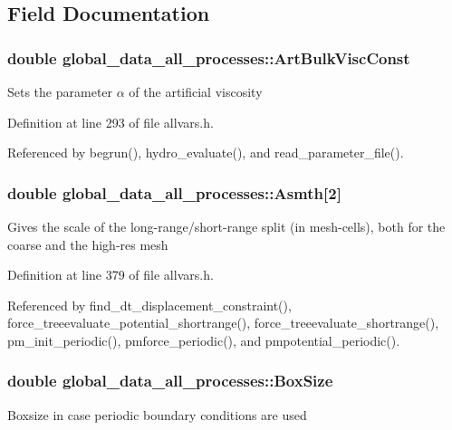 \subsection{Field Documentation}
\hypertarget{structglobal__data__all__processes_a14b9df6a6579d2ce6ef7c86aa0230217}{
\subsubsection[{ArtBulkViscConst}]{\setlength{\rightskip}{0pt plus 5cm}double {\bf global\_\-data\_\-all\_\-processes::ArtBulkViscConst}}}
\label{structglobal__data__all__processes_a14b9df6a6579d2ce6ef7c86aa0230217}
Sets the parameter $\alpha$ of the artificial viscosity 

Definition at line 293 of file allvars.h.



Referenced by begrun(), hydro\_\-evaluate(), and read\_\-parameter\_\-file().

\hypertarget{structglobal__data__all__processes_a3bf3f2dd9be45f8f203424e57b9d9de3}{
\subsubsection[{Asmth}]{\setlength{\rightskip}{0pt plus 5cm}double {\bf global\_\-data\_\-all\_\-processes::Asmth}\mbox{[}2\mbox{]}}}
\label{structglobal__data__all__processes_a3bf3f2dd9be45f8f203424e57b9d9de3}
Gives the scale of the long-\/range/short-\/range split (in mesh-\/cells), both for the coarse and the high-\/res mesh 

Definition at line 379 of file allvars.h.



Referenced by find\_\-dt\_\-displacement\_\-constraint(), force\_\-treeevaluate\_\-potential\_\-shortrange(), force\_\-treeevaluate\_\-shortrange(), pm\_\-init\_\-periodic(), pmforce\_\-periodic(), and pmpotential\_\-periodic().

\hypertarget{structglobal__data__all__processes_ac1b2e52cf547f5b2fe4bdfb0eaafa22f}{
\subsubsection[{BoxSize}]{\setlength{\rightskip}{0pt plus 5cm}double {\bf global\_\-data\_\-all\_\-processes::BoxSize}}}
\label{structglobal__data__all__processes_ac1b2e52cf547f5b2fe4bdfb0eaafa22f}
Boxsize in case periodic boundary conditions are used 

